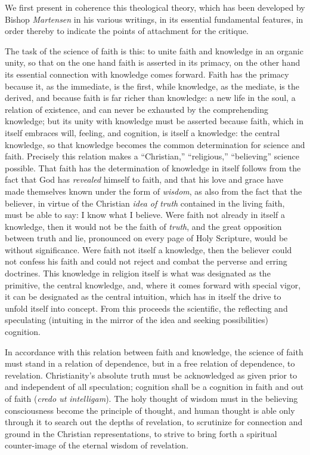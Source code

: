 \documentclass[12pt,a4paper]{book}
\begin{document}
We first present in coherence this theological theory, which has been developed
by Bishop \emph{Martensen} in his various writings, in its essential fundamental
features, in order thereby to indicate the points of attachment for the critique.

The task of the science of faith is this: to unite faith and knowledge in an
organic unity, so that on the one hand faith is asserted in its primacy, on the
other hand its essential connection with knowledge comes forward. Faith has the
primacy because it, as the immediate, is the first, while knowledge, as the
mediate, is the derived, and because faith is far richer than knowledge: a new
life in the soul, a relation of existence, and can never be exhausted by the
comprehending knowledge; but its unity with knowledge must be asserted because
faith, which in itself embraces will, feeling, and cognition, is itself a
knowledge: the central knowledge, so that knowledge becomes the common
determination for science and faith. Precisely this relation makes a
``Christian,'' ``religious,'' ``believing'' science possible. That faith has the
determination of knowledge in itself follows from the fact that God has \emph{revealed}
himself to faith, and that his love and grace have made themselves known under
the form of \emph{wisdom}, as also from the fact that the believer, in virtue of the
Christian \emph{idea of truth} contained in the living faith, must be able to say: I
know what I believe. Were faith not already in itself a knowledge, then it would
not be the faith of \emph{truth}, and the great opposition between truth and lie,
pronounced on every page of Holy Scripture, would be without significance. Were
faith not itself a knowledge, then the believer could not confess his faith and
could not reject and combat the perverse and erring doctrines. This knowledge in
religion itself is what was designated as the primitive, the central knowledge,
and, where it comes forward with special vigor, it can be designated as the
central intuition, which has in itself the drive to unfold itself into concept.
From this proceeds the scientific, the reflecting and speculating (intuiting in
the mirror of the idea and seeking possibilities) cognition.

In accordance with this relation between faith and knowledge, the science of
faith must stand in a relation of dependence, but in a free relation of
dependence, to revelation. Christianity's absolute truth must be acknowledged as
given prior to and independent of all speculation; cognition shall be a cognition
in faith and out of faith (\textit{credo ut intelligam}). The holy thought of
wisdom must in the believing consciousness become the principle of thought, and
human thought is able only through it to search out the depths of revelation, to
scrutinize for connection and ground in the Christian representations, to strive
to bring forth a spiritual counter-image of the eternal wisdom of revelation.
\end{document}
